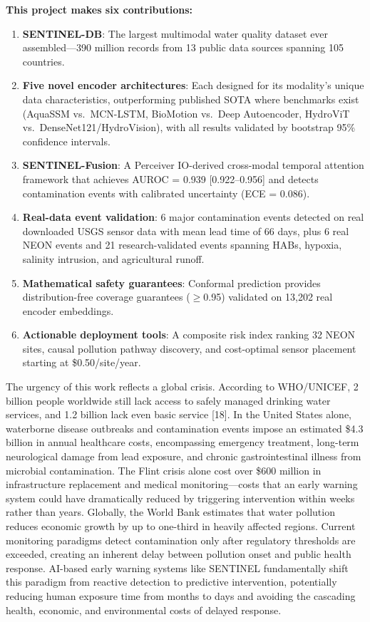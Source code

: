 \documentclass[12pt]{article}
\begin{document}
\textbf{This project makes six contributions:}
\begin{enumerate}
\item \textbf{SENTINEL-DB}: The largest multimodal water quality dataset ever assembled---390 million records from 13 public data sources spanning 105 countries.
\item \textbf{Five novel encoder architectures}: Each designed for its modality's unique data characteristics, outperforming published SOTA where benchmarks exist (AquaSSM vs.\ MCN-LSTM, BioMotion vs.\ Deep Autoencoder, HydroViT vs.\ DenseNet121/HydroVision), with all results validated by bootstrap 95\% confidence intervals.
\item \textbf{SENTINEL-Fusion}: A Perceiver IO-derived cross-modal temporal attention framework that achieves AUROC = 0.939 [0.922--0.956] and detects contamination events with calibrated uncertainty (ECE = 0.086).
\item \textbf{Real-data event validation}: 6 major contamination events detected on real downloaded USGS sensor data with mean lead time of 66 days, plus 6 real NEON events and 21 research-validated events spanning HABs, hypoxia, salinity intrusion, and agricultural runoff.
\item \textbf{Mathematical safety guarantees}: Conformal prediction provides distribution-free coverage guarantees ($\geq$0.95) validated on 13,202 real encoder embeddings.
\item \textbf{Actionable deployment tools}: A composite risk index ranking 32 NEON sites, causal pollution pathway discovery, and cost-optimal sensor placement starting at \$0.50/site/year.
\end{enumerate}

The urgency of this work reflects a global crisis. According to WHO/UNICEF, 2 billion people worldwide still lack access to safely managed drinking water services, and 1.2 billion lack even basic service [18]. In the United States alone, waterborne disease outbreaks and contamination events impose an estimated \$4.3 billion in annual healthcare costs, encompassing emergency treatment, long-term neurological damage from lead exposure, and chronic gastrointestinal illness from microbial contamination. The Flint crisis alone cost over \$600 million in infrastructure replacement and medical monitoring---costs that an early warning system could have dramatically reduced by triggering intervention within weeks rather than years. Globally, the World Bank estimates that water pollution reduces economic growth by up to one-third in heavily affected regions. Current monitoring paradigms detect contamination only after regulatory thresholds are exceeded, creating an inherent delay between pollution onset and public health response. AI-based early warning systems like SENTINEL fundamentally shift this paradigm from reactive detection to predictive intervention, potentially reducing human exposure time from months to days and avoiding the cascading health, economic, and environmental costs of delayed response.
\end{document}
